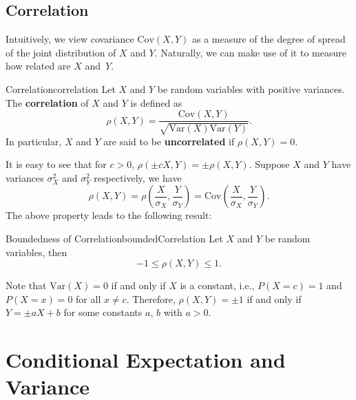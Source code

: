 \documentclass[math]{amznotes}
\theoremstyle{remark}
\begin{document}
\subsection{Correlation}
Intuitively, we view covariance $\mathrm{Cov}(X, Y)$ as a measure of the degree of spread of the joint distribution of $X$ and $Y$. Naturally, we can make use of it to measure how related are $X$ and~$Y$.
\begin{dfnbox}{Correlation}{correlation}
    Let $X$ and $Y$ be random variables with positive variances. The {\color{red} \textbf{correlation}} of $X$ and $Y$ is defined as
    \begin{equation*}
        \rho(X, Y) = \frac{\mathrm{Cov}(X, Y)}{\sqrt{\mathrm{Var}(X)\mathrm{Var}(Y)}}.
    \end{equation*}
    In particular, $X$ and $Y$ are said to be {\color{red} \textbf{uncorrelated}} if $\rho(X, Y) = 0$.
\end{dfnbox}
It is easy to see that for $c > 0$, $\rho(\pm cX, Y) = \pm\rho(X, Y)$. Suppose $X$ and $Y$ have variances $\sigma_X^2$ and $\sigma_Y^2$ respectively, we have
\begin{equation*}
    \rho(X, Y) = \rho\left(\frac{X}{\sigma_X}, \frac{Y}{\sigma_Y}\right) = \mathrm{Cov}\left(\frac{X}{\sigma_X}, \frac{Y}{\sigma_Y}\right).
\end{equation*}
The above property leads to the following result:
\begin{thmbox}{Boundedness of Correlation}{boundedCorrelation}
    Let $X$ and $Y$ be random variables, then 
    \begin{equation*}
        -1 \leq \rho(X, Y) \leq 1.
    \end{equation*}
\end{thmbox}
Note that $\mathrm{Var}(X) = 0$ if and only if $X$ is a constant, i.e., $P(X = c) = 1$ and $P(X = x) = 0$ for all $x \neq c$. Therefore, $\rho(X, Y) = \pm 1$ if and only if $Y = \pm aX + b$ for some constants $a$, $b$ with $a > 0$.
\section{Conditional Expectation and Variance}
\end{document}
